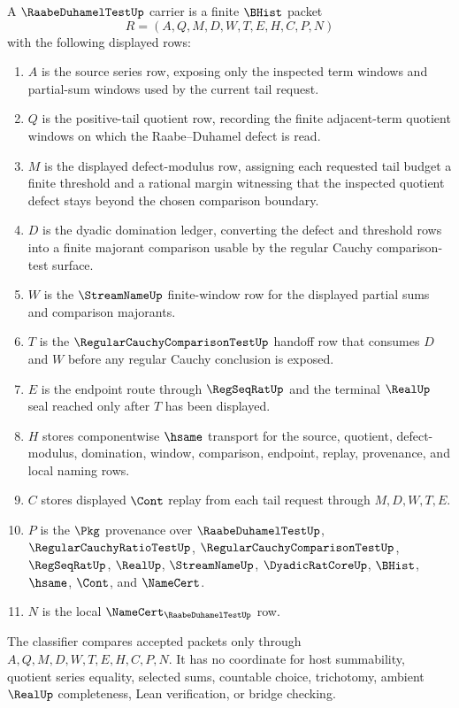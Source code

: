 \begin{definition}\label{def:raabe-duhamel-test-carrier}
A $\RaabeDuhamelTestUp$ carrier is a finite $\BHist$ packet
$$
R=(A,Q,M,D,W,T,E,H,C,P,N)
$$
with the following displayed rows:
\begin{enumerate}
\item $A$ is the source series row, exposing only the inspected term windows and partial-sum windows used by the current tail request.
\item $Q$ is the positive-tail quotient row, recording the finite adjacent-term quotient windows on which the Raabe--Duhamel defect is read.
\item $M$ is the displayed defect-modulus row, assigning each requested tail budget a finite threshold and a rational margin witnessing that the inspected quotient defect stays beyond the chosen comparison boundary.
\item $D$ is the dyadic domination ledger, converting the defect and threshold rows into a finite majorant comparison usable by the regular Cauchy comparison-test surface.
\item $W$ is the $\StreamNameUp$ finite-window row for the displayed partial sums and comparison majorants.
\item $T$ is the $\RegularCauchyComparisonTestUp$ handoff row that consumes $D$ and $W$ before any regular Cauchy conclusion is exposed.
\item $E$ is the endpoint route through $\RegSeqRatUp$ and the terminal $\RealUp$ seal reached only after $T$ has been displayed.
\item $H$ stores componentwise $\hsame$ transport for the source, quotient, defect-modulus, domination, window, comparison, endpoint, replay, provenance, and local naming rows.
\item $C$ stores displayed $\Cont$ replay from each tail request through $M,D,W,T,E$.
\item $P$ is the $\Pkg$ provenance over $\RaabeDuhamelTestUp$, $\RegularCauchyRatioTestUp$, $\RegularCauchyComparisonTestUp$, $\RegSeqRatUp$, $\RealUp$, $\StreamNameUp$, $\DyadicRatCoreUp$, $\BHist$, $\hsame$, $\Cont$, and $\NameCert$.
\item $N$ is the local $\NameCert_{\RaabeDuhamelTestUp}$ row.
\end{enumerate}
The classifier compares accepted packets only through $A,Q,M,D,W,T,E,H,C,P,N$. It has no coordinate for host summability, quotient series equality, selected sums, countable choice, trichotomy, ambient $\RealUp$ completeness, Lean verification, or bridge checking.
\end{definition}

